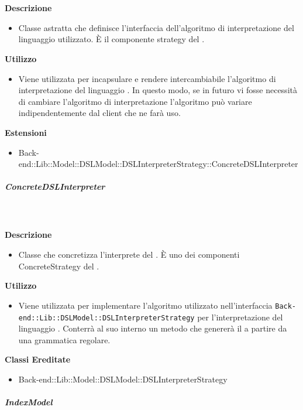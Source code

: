 				\textbf{\\ \\ Descrizione} 
					\begin{itemize}
						\item[] Classe astratta che definisce l'interfaccia dell'algoritmo di interpretazione del linguaggio  utilizzato. È il componente strategy del  .
					\end{itemize}      
				\textbf{Utilizzo}  
					\begin{itemize}
						\item[] Viene utilizzata per incapsulare e rendere intercambiabile l'algoritmo di interpretazione del linguaggio . In questo modo, se in futuro vi fosse necessità di cambiare l'algoritmo di interpretazione l'algoritmo può variare indipendentemente dal client che ne farà uso.
					\end{itemize}
					\textbf{Estensioni}
					\begin{itemize}
							\item{Back-end::Lib::Model::DSLModel::DSLInterpreterStrategy::ConcreteDSLInterpreter}
					\end{itemize}
			\subparagraph{ConcreteDSLInterpreter}
				
				\textbf{\\ \\ Descrizione} 
					\begin{itemize}
						\item[] Classe che concretizza l'interprete del . È uno dei componenti ConcreteStrategy del  .
					\end{itemize}      
				\textbf{Utilizzo}  
					\begin{itemize}
						\item[] Viene utilizzata per implementare l'algoritmo utilizzato nell'interfaccia \texttt{Back-end::Lib::DSLModel::DSLInterpreterStrategy} per l'interpretazione del linguaggio . Conterrà al suo interno un metodo che genererà il  a partire da una grammatica regolare.
					\end{itemize}
					\textbf{Classi Ereditate}
					\begin{itemize}
								\item{Back-end::Lib::Model::DSLModel::DSLInterpreterStrategy}
					\end{itemize}
			\subparagraph{IndexModel}
				
